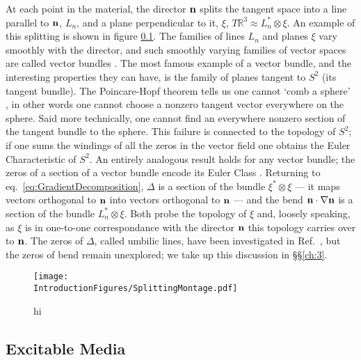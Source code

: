 At each point in the material, the director $\bf n$ splits the tangent space into a line parallel to $\bf n$, $L_n$, and a plane perpendicular to it, $\xi$, $T \mathbb{R}^3 \approx L_n^* \otimes \xi$. An example of this splitting is shown in figure \ref{}. The families of lines $L_n$ and planes $\xi$ vary smoothly with the director, and such smoothly varying families of vector spaces are called vector bundles \cite{}. The most famous example of a vector bundle, and the interesting properties they can have, is the family of planes tangent to $S^2$ (its tangent bundle). The Poincare-Hopf theorem tells us one cannot `comb a sphere' \cite{}, in other words one cannot choose a nonzero tangent vector everywhere on the sphere. Said more technically, one cannot find an everywhere nonzero section of the tangent bundle to the sphere. This failure is connected to the topology of $S^2$; if one sums the windings of all the zeros in the vector field one obtains the Euler Characteristic of $S^2$. An entirely analogous result holds for any vector bundle; the zeros of a section of a vector bundle encode its Euler Class \cite{}. Returning to eq.~\ref{eq:GradientDecomposition}, $\Delta$ is a section of the bundle $\xi^* \otimes \xi$ --- it maps vectors orthogonal to $\bf n$ into vectors orthogonal to $\bf n$ --- and the bend $\bf n \cdot \nabla n$ is a section of the bundle $L_n^* \otimes \xi$. Both probe the topology of $\xi$ and, loosely speaking, as $\xi$ is in one-to-one correspondance with the director $\bf n$ this topology carries over to $\bf n$. The zeros of $\Delta$, called umbilic lines, have been investigated in Ref.~\cite{Machon}, but the zeros of bend remain unexplored; we take up this discussion in \S\S \ref{ch:3}. 
\begin{figure}[htbp]
\centering
\texttt{[image: \\IntroductionFigures/SplittingMontage.pdf]}
\caption{hi }
\label{fig:FrankFreeEnergy}
\end{figure}
\subsection{Excitable Media}



